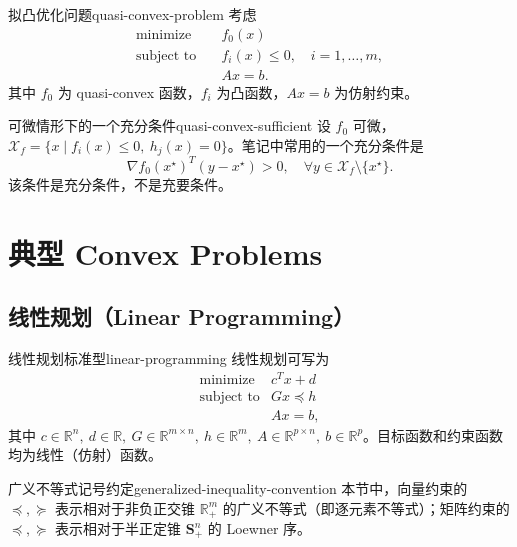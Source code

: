 \documentclass[11pt,a4paper]{article}
\begin{document}
\begin{definition}{拟凸优化问题}{quasi-convex-problem}
考虑
\[
\begin{aligned}
\text{minimize}\quad & f_0(x)\\
\text{subject to}\quad & f_i(x)\le0,\quad i=1,\dots,m,\\
& Ax=b.
\end{aligned}
\]
其中 $f_0$ 为 quasi-convex 函数，$f_i$ 为凸函数，$Ax=b$ 为仿射约束。
\end{definition}

\begin{remark}{可微情形下的一个充分条件}{quasi-convex-sufficient}
设 $f_0$ 可微，$\mathcal X_f=\{x\mid f_i(x)\le0,\ h_j(x)=0\}$。笔记中常用的一个充分条件是
\[
\nabla f_0(x^\star)^T(y-x^\star)>0,\quad
\forall y\in\mathcal X_f\setminus\{x^\star\}.
\]
该条件是充分条件，不是充要条件。
\end{remark}

\section{典型 Convex Problems}\label{sec:ch4-typical-problems}

\subsection{线性规划（Linear Programming）}
\begin{definition}{线性规划标准型}{linear-programming}
线性规划可写为
\[
\begin{array}{ll}
\text{minimize} & c^Tx+d\\
\text{subject to} & Gx\preceq h\\
& Ax=b,
\end{array}
\]
其中 $c\in\mathbb R^n,\ d\in\mathbb R,\ G\in\mathbb R^{m\times n},\ h\in\mathbb R^m,\ A\in\mathbb R^{p\times n},\ b\in\mathbb R^p$。目标函数和约束函数均为线性（仿射）函数。
\end{definition}

\begin{remark}{广义不等式记号约定}{generalized-inequality-convention}
本节中，向量约束的 $\preceq,\succeq$ 表示相对于非负正交锥 $\mathbb R_+^m$ 的广义不等式（即逐元素不等式）；矩阵约束的 $\preceq,\succeq$ 表示相对于半正定锥 $\mathbf S_+^n$ 的 Loewner 序。
\end{remark}
\end{document}

